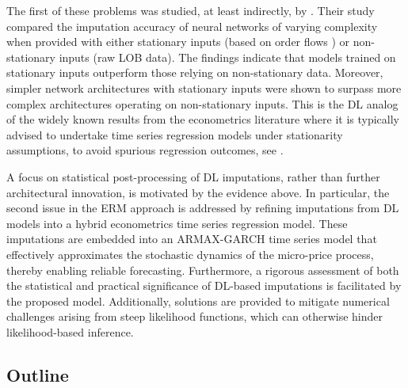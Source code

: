 \documentclass{rQUF2e}
\theoremstyle{plain}
\theoremstyle{definition}
\theoremstyle{remark}
\begin{document}
The first of these problems was studied, at least indirectly, by \citet{kolm2023deep}. Their study compared the imputation accuracy of neural networks of varying complexity when provided with either stationary inputs (based on order flows \citep{cont2013price}) or non-stationary inputs (raw LOB data). The findings indicate that models trained on stationary inputs outperform those relying on non-stationary data. Moreover, simpler network architectures with stationary inputs were shown to surpass more complex architectures operating on non-stationary inputs. This is the DL analog of the widely known results from the econometrics literature where it is typically advised to undertake time series regression models under stationarity assumptions, to avoid spurious regression outcomes, see \citep{granger1974spurious, phillips1986understanding, hamilton_time_1994}.

A focus on statistical post-processing of DL imputations, rather than further architectural innovation, is motivated by the evidence above. In particular, the second issue in the ERM approach is addressed by refining imputations from DL models into a hybrid econometrics time series regression model. These imputations are embedded into an ARMAX-GARCH time series model that effectively approximates the stochastic dynamics of the micro-price process, thereby enabling reliable forecasting. Furthermore, a rigorous assessment of both the statistical and practical significance of DL-based imputations is facilitated by the proposed model. Additionally, solutions are provided to mitigate numerical challenges arising from steep likelihood functions, which can otherwise hinder likelihood-based inference.

\subsection{Outline}
\label{subsec:outline}
\end{document}
